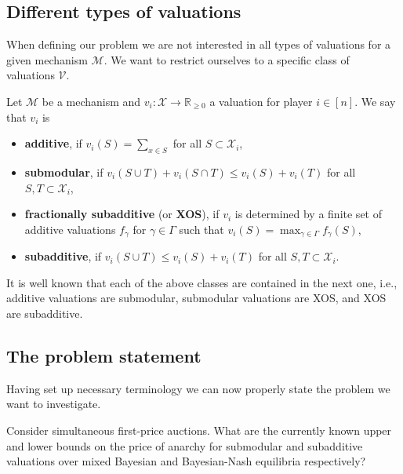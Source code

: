 \subsection{Different types of valuations} %
\label{sub:Different types of valuations}
When defining our problem we are not interested in all types of valuations for a given mechanism $ \mathcal{M} $. We want to restrict ourselves to a specific class of valuations $ \mathcal{V} $.
\begin{definition}
  Let $ \mathcal{M} $ be a mechanism and $ v_i: \mathcal{X} \to \mathbb{R}_{\geq 0} $ a valuation for player $ i \in [n] $. We say that $ v_i $ is
  \begin{itemize}
    \item \textbf{additive}, if $ v_i(S) = \sum_{x \in S} $ for all $ S \subset \mathcal{X}_i $,
    \item \textbf{submodular}, if $ v_i(S \cup T) + v_i(S \cap T) \leq v_i(S) + v_i(T) $ for all $ S,T \subset \mathcal{X}_i $,
    \item \textbf{fractionally subadditive} (or \textbf{XOS}), if $ v_i $ is determined by a finite set of additive valuations $ f_\gamma $ for $ \gamma \in \Gamma $ such that $ v_i(S) = \max_{\gamma \in \Gamma}f_\gamma(S) $,
    \item \textbf{subadditive}, if $ v_i(S \cup T) \leq v_i(S) + v_i(T)$ for all $ S,T \subset \mathcal{X}_i $.
  \end{itemize}
\end{definition}
It is well known that each of the above classes are contained in the next one, i.e., additive valuations are submodular, submodular valuations are XOS, and XOS are subadditive.

\subsection{The problem statement} %
\label{sub:The problem statement}
Having set up necessary terminology we can now properly state the problem we want to investigate.
\begin{problem}
  Consider simultaneous first-price auctions. What are the currently known upper and lower bounds on the price of anarchy for submodular and subadditive valuations over mixed Bayesian and Bayesian-Nash equilibria respectively?
\end{problem}
